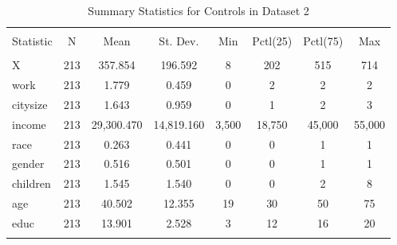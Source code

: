 
\begin{table}[!htbp] \centering 
  \caption{Summary Statistics for Controls in Dataset 2} 
  \label{} 
\begin{tabular}{@{\extracolsep{5pt}}lccccccc} 
\\[-1.8ex]\hline 
\hline \\[-1.8ex] 
Statistic & \multicolumn{1}{c}{N} & \multicolumn{1}{c}{Mean} & \multicolumn{1}{c}{St. Dev.} & \multicolumn{1}{c}{Min} & \multicolumn{1}{c}{Pctl(25)} & \multicolumn{1}{c}{Pctl(75)} & \multicolumn{1}{c}{Max} \\ 
\hline \\[-1.8ex] 
X & 213 & 357.854 & 196.592 & 8 & 202 & 515 & 714 \\ 
work & 213 & 1.779 & 0.459 & 0 & 2 & 2 & 2 \\ 
citysize & 213 & 1.643 & 0.959 & 0 & 1 & 2 & 3 \\ 
income & 213 & 29,300.470 & 14,819.160 & 3,500 & 18,750 & 45,000 & 55,000 \\ 
race & 213 & 0.263 & 0.441 & 0 & 0 & 1 & 1 \\ 
gender & 213 & 0.516 & 0.501 & 0 & 0 & 1 & 1 \\ 
children & 213 & 1.545 & 1.540 & 0 & 0 & 2 & 8 \\ 
age & 213 & 40.502 & 12.355 & 19 & 30 & 50 & 75 \\ 
educ & 213 & 13.901 & 2.528 & 3 & 12 & 16 & 20 \\ 
\hline \\[-1.8ex] 
\end{tabular} 
\end{table} 
